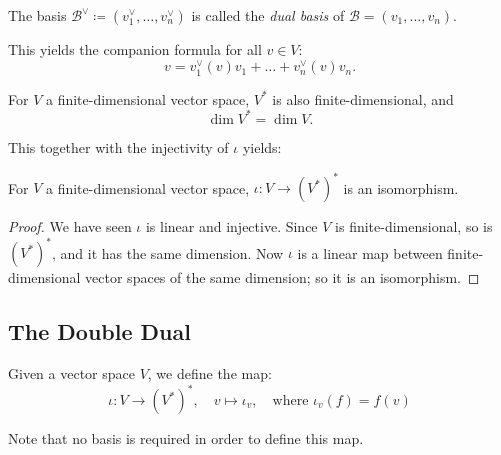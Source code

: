 \documentclass[../linear_algebra_and_groups.tex]{subfiles}
\begin{document}
\begin{definition}
    \begin{shaded*}
        The basis $\mathcal{B}^\vee \coloneqq (v_1^\vee, \dots, v_n^\vee)$ is called the \textit{dual basis} of $\mathcal{B} = (v_1, \dots, v_n)$.
    \end{shaded*}
\end{definition}

This yields the companion formula for all $v \in V$: \[v = v_1^\vee(v)v_1 + \dots + v_n^\vee(v)v_n.\]

\begin{corollary}
    \begin{shaded*}
    For $V$ a finite-dimensional vector space, $V^*$ is also finite-dimensional, and \[\dim V^* = \dim V.\]
    \end{shaded*}
\end{corollary}

This together with the injectivity of $\iota$ yields:

\begin{corollary}
    \begin{shaded*}
    For $V$ a finite-dimensional vector space, $\iota : V \to (V^*)^*$ is an isomorphism.
    \end{shaded*}
\end{corollary}
\begin{proof}
    We have seen $\iota$ is linear and injective. Since $V$ is finite-dimensional, so is $(V^*)^*$, and it has the same dimension. Now $\iota$ is a linear map between finite-dimensional vector spaces of the same dimension; so it is an isomorphism.
    \qedhere
\end{proof}

\subsection{The Double Dual}

Given a vector space $V$, we define the map: \[\iota : V \to (V^*)^*, \quad v \mapsto \iota_v, \quad \text{where } \iota_v(f) = f(v)\]
\begin{remark}
    Note that no basis is required in order to define this map.
\end{remark}
\end{document}

